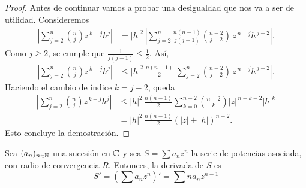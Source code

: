 \begin{proof}
    Antes de continuar vamos a probar una desigualdad que nos va a ser de utilidad. 
    Consideremos
    \begin{align*}
        \left| \sum_{j=2}^{n} \binom{n}{j} z^{\,k-j} h^j \right|
        &= |h|^2 \, \left| \sum_{j=2}^{n} 
            \frac{n(n-1)}{j(j-1)} \binom{n-2}{j-2} \, z^{\,n-j} h^{\,j-2} \right|.
    \end{align*}
    Como $j \geq 2$, se cumple que $\tfrac{1}{j(j-1)} \leq \tfrac{1}{2}$. Así, 
    \begin{align*}
        \left| \sum_{j=2}^{n} \binom{n}{j} z^{\,k-j} h^j \right|
        &\leq |h|^2 \, \frac{n(n-1)}{2} 
            \left| \sum_{j=2}^{n} \binom{n-2}{j-2} \, z^{\,n-j} h^{\,j-2} \right|.
    \end{align*}
    Haciendo el cambio de índice $k = j-2$, queda
    \begin{align*}
        \left| \sum_{j=2}^{n} \binom{n}{j} z^{\,k-j} h^j \right|
        &\leq |h|^2 \, \frac{n(n-1)}{2} 
            \sum_{k=0}^{n-2} \binom{n-2}{k} |z|^{\,n-k-2} |h|^k \\
        &= |h|^2 \, \frac{n(n-1)}{2} (|z|+|h|)^{n-2}.
    \end{align*}
    Esto concluye la demostración.
\end{proof}

\begin{theorem}
    Sea $(a_n)_{n \in \mathbb{N}}$ una sucesión en $\mathbb{C}$ y sea $S = \sum a_n z^n$ la serie de potencias asociada, con radio de convergencia $R$. Entonces, la derivada de $S$ es
    \begin{equation*}
        S' = \left(\sum a_n z^n\right)' = \sum n a_n z^{n-1}
    \end{equation*}
\end{theorem}

